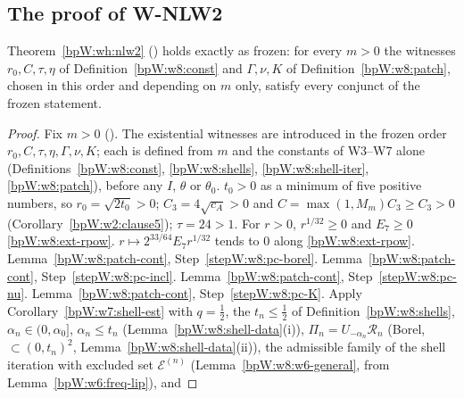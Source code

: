 \subsection{The proof of W-NLW2}\label{bpW:w8:proof-sec}

\begin{theorem}\label{bpW:w8:nlw2-proof}
Theorem~\ref{bpW:wh:nlw2} () holds exactly as frozen: for every $m>0$ the witnesses $r_0,C,\tau,\eta$ of
Definition~\ref{bpW:w8:const} and $\Gamma,\nu,K$ of Definition~\ref{bpW:w8:patch}, chosen in this order and depending on $m$ only,
satisfy every conjunct of the frozen statement.
\end{theorem}
\begin{proof}
Fix $m>0$ (). The existential witnesses are introduced in the frozen order $r_0,C,\tau,\eta,\Gamma,\nu,K$; each is
defined from $m$ and the constants of W3--W7 alone (Definitions~\ref{bpW:w8:const}, \ref{bpW:w8:shells}, \ref{bpW:w8:shell-iter},
\ref{bpW:w8:patch}), before any $I$, $\theta$ or $\theta_0$.
\label{stepW:w8:p-pos} $t_0>0$ as a minimum of five positive numbers, so $r_0=\sqrt{2t_0}>0$;
$C_3=4\sqrt{c_A}>0$ and $C=\max(1,M_m)C_3\ge C_3>0$ (Corollary~\ref{bpW:w2:clause5}); $\tau=24>1$.
\label{stepW:w8:p-etapos} For $r>0$, $r^{1/32}\ge0$ and $E_7\ge0$ \ref{bpW:w8:ext-rpow}.
\label{stepW:w8:p-etalim} $r\mapsto2^{33/64}E_7r^{1/32}$ tends to $0$ along  \ref{bpW:w8:ext-rpow}.
\label{stepW:w8:p-meas} Lemma~\ref{bpW:w8:patch-cont}, Step~\ref{stepW:w8:pc-borel}.
\label{stepW:w8:p-incl} Lemma~\ref{bpW:w8:patch-cont},
Step~\ref{stepW:w8:pc-incl}.
\label{stepW:w8:p-nucont} Lemma~\ref{bpW:w8:patch-cont}, Step~\ref{stepW:w8:pc-nu}.
\label{stepW:w8:p-Kcont} Lemma~\ref{bpW:w8:patch-cont},
Step~\ref{stepW:w8:pc-K}.
\label{stepW:w8:p-dens} Apply Corollary~\ref{bpW:w7:shell-est} with $q=\frac12$, the $t_n\le\frac12$ of
Definition~\ref{bpW:w8:shells}, $\alpha_n\in(0,\alpha_0]$, $\alpha_n\le t_n$ (Lemma~\ref{bpW:w8:shell-data}(i)), $\Pi_n=U_{-\alpha_n}\mathcal R_n$
(Borel, $\subset(0,t_n)^2$, Lemma~\ref{bpW:w8:shell-data}(ii)), the admissible family of the shell iteration with excluded set
$\mathcal E^{(n)}$ (Lemma~\ref{bpW:w8:w6-general}, from Lemma~\ref{bpW:w6:freq-lip}), and

\end{proof}
